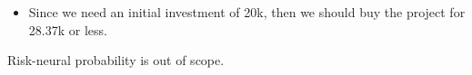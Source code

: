 \begin{example}
    \begin{itemize}
        \item Since we need an initial investment of 20k, then we should buy the project for 28.37k or less.
    \end{itemize}
\end{example}

\begin{example}
    Risk-neural probability is out of scope.
\end{example}

